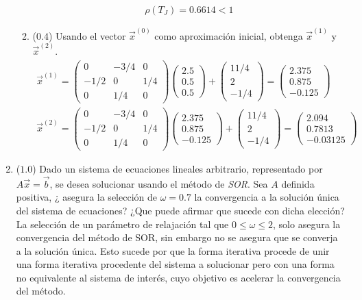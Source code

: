 \documentclass[12pt]{article}
\begin{document}
\begin{enumerate}[leftmargin=*,widest=9]
\begin{enumerate}[label=\alph*]
\begin{eqnarray*}
\rho(T_J) = 0.6614 < 1
\end{eqnarray*}
   \item (\(0.4\)) Usando el vector \(\vec{x}^{(0)}\) como aproximación inicial, obtenga \(\vec{x}^{(1)}\) y \(\vec{x}^{(2)}\).
   \begin{eqnarray*}
   \vec{x}^{(1)} = \begin{pmatrix}
    0 & -3/4 & 0 \\ -1/2 & 0 & 1/4\\ 0 & 1/4 & 0
    \end{pmatrix} \begin{pmatrix}
    2.5 \\ 0.5\\ 0.5
    \end{pmatrix} + \begin{pmatrix}
    11/4 \\ 2\\ -1/4
    \end{pmatrix} = \begin{pmatrix}
    2.375 \\ 0.875\\ -0.125
    \end{pmatrix} \\
    \vec{x}^{(2)} = \begin{pmatrix}
    0 & -3/4 & 0 \\ -1/2 & 0 & 1/4\\ 0 & 1/4 & 0
    \end{pmatrix} \begin{pmatrix}
    2.375 \\ 0.875\\ -0.125
    \end{pmatrix} + \begin{pmatrix}
    11/4 \\ 2\\ -1/4
    \end{pmatrix} = \begin{pmatrix}
    2.094 \\ 0.7813\\ -0.03125
    \end{pmatrix}
   \end{eqnarray*}
    \end{enumerate}
  \item (\(1.0\)) Dado un sistema de ecuaciones lineales arbitrario, representado por \(A\vec{x} = \vec{b}\), se desea solucionar usando el método de \textit{SOR}. Sea \(A\) definida positiva, ¿ asegura la selección de \(\omega = 0.7\) la convergencia a la solución única del sistema de ecuaciones? ¿Que puede afirmar que sucede con dicha elección?
  La selección de un parámetro de relajación tal que \(0 \leq \omega \leq 2\), solo asegura la convergencia del método de SOR, sin embargo no se asegura que se converja a la solución única. Esto sucede por que la forma iterativa procede de unir una forma iterativa procedente del sistema a solucionar pero con una forma no equivalente al sistema de interés, cuyo objetivo es acelerar la convergencia del método.
  \end{enumerate}
\end{document}
